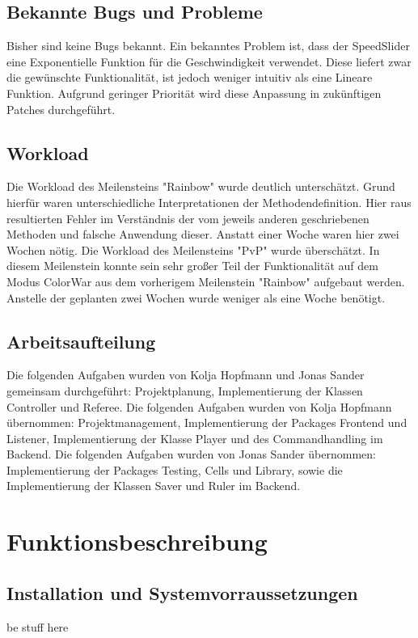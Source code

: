\documentclass[12pt]{article}
\theoremstyle{plain}
\begin{document}
\begin{linenumbers}
\subsection{Bekannte Bugs und Probleme}
Bisher sind keine Bugs bekannt. Ein bekanntes Problem ist, dass der SpeedSlider eine Exponentielle Funktion für die Geschwindigkeit verwendet. Diese liefert zwar die gewünschte Funktionalität, ist jedoch weniger intuitiv als eine Lineare Funktion. Aufgrund geringer Priorität wird diese Anpassung in zukünftigen Patches durchgeführt.
\subsection{Workload}
Die Workload des Meilensteins "Rainbow" wurde deutlich unterschätzt. Grund hierfür waren unterschiedliche Interpretationen der Methodendefinition. Hier raus resultierten Fehler im Verständnis der vom jeweils anderen geschriebenen Methoden und falsche Anwendung dieser. Anstatt einer Woche waren hier zwei Wochen nötig. Die Workload des Meilensteins "PvP" wurde überschätzt. In diesem Meilenstein konnte sein sehr großer Teil der Funktionalität auf dem Modus ColorWar aus dem vorherigem Meilenstein "Rainbow" aufgebaut werden. Anstelle der geplanten zwei Wochen wurde weniger als eine Woche benötigt.
\subsection{Arbeitsaufteilung}
Die folgenden Aufgaben wurden von Kolja Hopfmann und Jonas Sander gemeinsam durchgeführt: Projektplanung, Implementierung der Klassen Controller und Referee.
Die folgenden Aufgaben wurden von Kolja Hopfmann übernommen: Projektmanagement, Implementierung der Packages Frontend und Listener, Implementierung der Klasse Player und des Commandhandling im Backend.
Die folgenden Aufgaben wurden von Jonas Sander übernommen: Implementierung der Packages Testing, Cells und Library, sowie die Implementierung der Klassen Saver und Ruler im Backend.
\section{Funktionsbeschreibung}
\subsection{Installation und Systemvorraussetzungen}
be stuff here
\newpage

\end{linenumbers}
\end{document}
